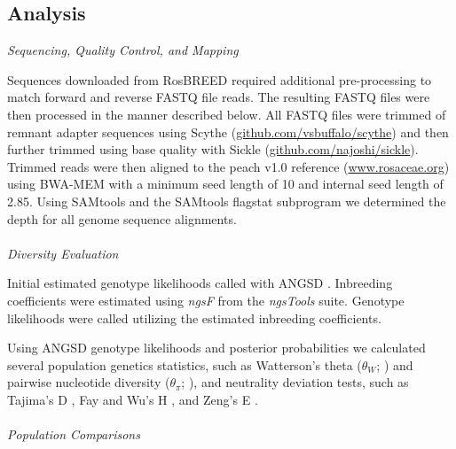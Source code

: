 \documentclass[12pt]{article}
\newcommand{\jri}[1]{\textcolor{red}{\emph{#1}}}
\newcommand{\dv}[1]{\textcolor{blue}{\emph{#1}}}
\begin{document}
\subsection*{Analysis}
\emph{Sequencing, Quality Control, and Mapping}

Sequences downloaded from RosBREED required additional pre-processing to match forward and reverse FASTQ file reads.
%
The resulting FASTQ files were then processed in the manner described below.
%
All FASTQ files were trimmed of remnant adapter sequences using Scythe (\url{github.com/vsbuffalo/scythe}) and then further trimmed using base quality with Sickle (\url{github.com/najoshi/sickle}). 
%
Trimmed reads were then aligned to the peach v1.0 reference (\url{www.rosaceae.org}) using BWA-MEM \citep{li2013aligning} with a minimum seed length of 10 and internal seed length of 2.85.
%
Using SAMtools and the SAMtools flagstat subprogram \citep{li2009sequence} we determined the depth for all genome sequence alignments.
\\
%
%
\\
\emph{Diversity Evaluation}

Initial estimated genotype likelihoods called with ANGSD \citep{korneliussen2014angsd}. 
%
Inbreeding coefficients were estimated using \emph{ngsF} from the \emph{ngsTools} \citep{fumagalli2014ngstools} suite.
%
Genotype likelihoods were called utilizing the estimated inbreeding coefficients. 
%


Using ANGSD genotype likelihoods and posterior probabilities we calculated several population genetics statistics, such as Watterson's theta ($\theta_{W}$; \citealp{watterson1975number}) and pairwise nucleotide diversity ($\theta_{\pi}$; \citealp{nei1979mathematical}), and neutrality deviation tests, such as Tajima's D \citep{tajima1989statistical}, Fay and Wu's H \citep{fay2000hitchhiking}, and Zeng's E \citep{zeng2006statistical}.
\\
%
\\
\emph{Population Comparisons}
\end{document}
